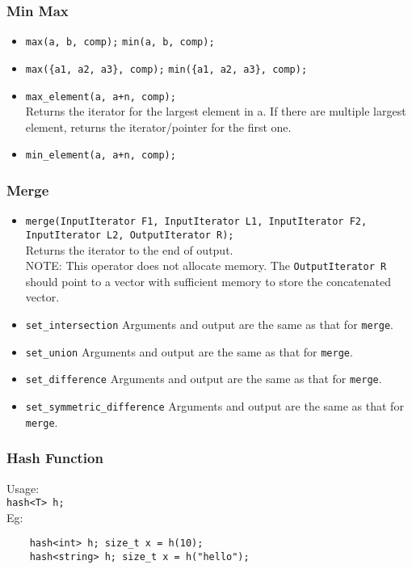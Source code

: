 \subsubsection{Min Max}
\begin{itemize}
\item \texttt{max(a, b, comp);} \texttt{min(a, b, comp);}
\item \texttt{max(\{a1, a2, a3\}, comp);} \texttt{min(\{a1, a2, a3\}, comp);}
\item \texttt{max\_element(a, a+n, comp);}\\
Returns the iterator for the largest element in a. If there are multiple largest element, returns the iterator/pointer for the first one.
\item \texttt{min\_element(a, a+n, comp);}\\
\end{itemize}

\subsubsection{Merge}
\begin{itemize}
\item \texttt{merge(InputIterator F1, InputIterator L1, InputIterator F2, InputIterator L2, OutputIterator R);} \\
Returns the iterator to the end of output.\\
NOTE: This operator does not allocate memory. The \texttt{OutputIterator R} should point to a vector with sufficient memory to store the concatenated vector.\\
\item \texttt{set\_intersection} Arguments and output are the same as that for \texttt{merge}.
\item \texttt{set\_union} Arguments and output are the same as that for \texttt{merge}.
\item \texttt{set\_difference} Arguments and output are the same as that for \texttt{merge}.
\item \texttt{set\_symmetric\_difference} Arguments and output are the same as that for \texttt{merge}.
\end{itemize}

\subsubsection{Hash Function}
Usage:\\
\texttt{hash<T> h;}\\
Eg:
\begin{verbatim}
    hash<int> h; size_t x = h(10);
    hash<string> h; size_t x = h("hello");
\end{verbatim}

